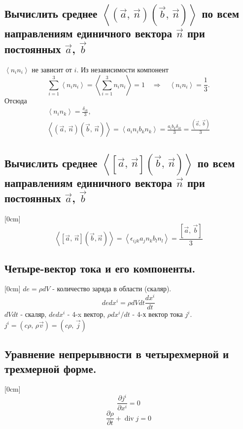 \documentclass[a4paper,12pt]{article}
\begin{document}
\subsection{Вычислить среднее $\left<\left(\vec{a},\,\vec{n}\right)
\left( \vec{b},\,\vec{n} \right) \right>$ по всем направлениям единичного
вектора $\vec{n}$ при постоянных  $\vec{a}$, $\vec{b}$}
$\left< n_i n_i\right>$ не зависит от $i$. Из независимости компонент 
\[
\sum_{i=1}^3\left< n_i n_i\right>=\left<\sum_{i=1}^3 n_i n_i\right>=1
\quad \Rightarrow \quad \left< n_i n_i\right>=\frac{1}{3}.
\]
Отсюда 
\begin{gather*}
	\left< n_i n_k\right>=\frac{\delta_{ik}}{3},\\
	\left<\left(\vec{a},\,\vec{n}\right)
\left(\vec{b}
,\,\vec{n}\right)\right>=\left< a_i n_i b_k n_k\right>=\frac{a_i b_k \delta_{ik}}{3}=
\frac{\left(\vec{a},\,\vec{b}\right)}{3}
\end{gather*}
\subsection{Вычислить среднее $\left<\left[\vec{a},\,\vec{n}\right]
\left( \vec{b},\,\vec{n} \right) \right>$ по всем направлениям единичного
вектора $\vec{n}$ при постоянных  $\vec{a}$, $\vec{b}$}
[0cm]
\[
	\left<[\vec{a},\,\vec{n}]\left(\vec{b},\vec{n}\right)\right>=\left<
	\epsilon_{ijk}
	a_j n_k b_l n_l\right>=\frac{\left[\vec{a},\,\vec{b}\right]}{3}
\]
\subsection{Четыре-вектор тока и его компоненты.}
[0cm]
$de=\rho dV$ - количество заряда в области (скаляр).
\[
de dx^i=\rho dV dt \frac{dx^i}{dt}
\]
$dV dt$ - скаляр, $de dx^i$ - 4-x вектор, $\rho dx^i/dt$ - 4-х вектор тока $j^i$.
$j^i=\left(c\rho,\,\rho\vec{v}\right)=\left(c\rho,\,\vec{j}\right)$
\subsection{Уравнение непрерывности в четырехмерной и трехмерной форме.}
[0cm]
\[\frac{\partial j^i}{\partial x^i}=0\]
\[\frac{\partial \rho}{\partial t}+\operatorname{div} j=0 \]
\end{document}
